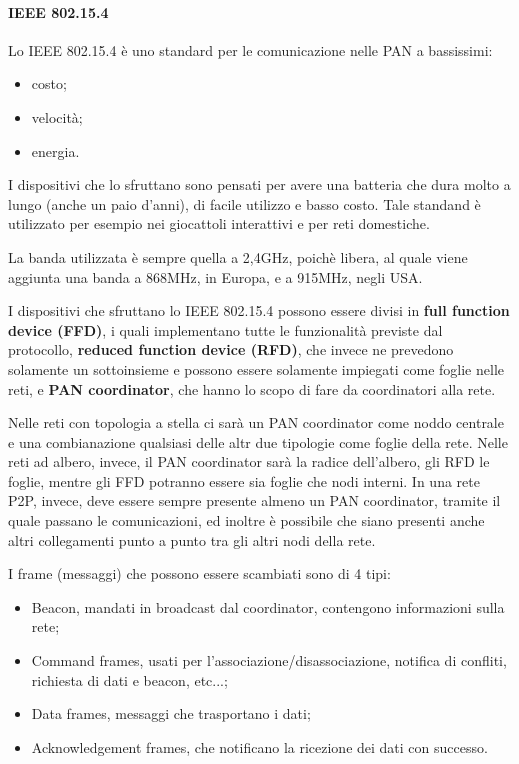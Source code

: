\paragraph{IEEE 802.15.4}
Lo IEEE 802.15.4 è uno standard per le comunicazione nelle PAN a bassissimi:
\begin{itemize}
  \item costo;
  \item velocità;
  \item energia.
\end{itemize}

I dispositivi che lo sfruttano sono pensati per avere una batteria che dura 
molto a lungo (anche un paio d'anni), di facile utilizzo e basso costo. Tale 
standand è utilizzato per esempio nei giocattoli interattivi e per reti 
domestiche.

La banda utilizzata è sempre quella a 2,4GHz, poichè libera, al quale viene 
aggiunta una banda a 868MHz, in Europa, e a 915MHz, negli USA.

I dispositivi che sfruttano lo IEEE 802.15.4 possono essere divisi in 
\textbf{full function device (FFD)}, i quali implementano tutte le funzionalità 
previste dal protocollo, \textbf{reduced function device (RFD)}, che invece ne 
prevedono solamente un sottoinsieme e possono essere solamente impiegati come 
foglie nelle reti, e \textbf{PAN coordinator}, che hanno lo scopo di fare da 
coordinatori alla rete.

Nelle reti con topologia a stella ci sarà un PAN coordinator come noddo centrale 
e una combianazione qualsiasi delle altr due tipologie come foglie della rete. 
Nelle reti ad albero, invece, il PAN coordinator sarà la radice dell'albero, gli 
RFD le foglie, mentre gli FFD potranno essere sia foglie che nodi interni. In 
una rete P2P, invece, deve essere sempre presente almeno un PAN coordinator, 
tramite il quale passano le comunicazioni, ed inoltre è possibile che siano 
presenti anche altri collegamenti punto a punto tra gli altri nodi della rete.

I frame (messaggi) che possono essere scambiati sono di 4 tipi:
\begin{itemize}
  \item Beacon, mandati in broadcast dal coordinator, contengono informazioni 
        sulla rete;
  \item Command frames, usati per l'associazione/disassociazione, notifica di 
        confliti, richiesta di dati e beacon, etc...;
  \item Data frames, messaggi che trasportano i dati;
  \item Acknowledgement frames, che notificano la ricezione dei dati con successo.
\end{itemize}

